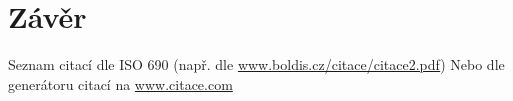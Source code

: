 \documentclass[12pt,a4paper]{article} %
\begin{document}








\section{Závěr} %

\lipsum[12]


\begin{thebibliography}{99} %

 Seznam citací dle ISO 690 (např. dle \url{www.boldis.cz/citace/citace2.pdf})
 Nebo dle generátoru citací na \url{www.citace.com}
 
\end{thebibliography}

\end{document}
